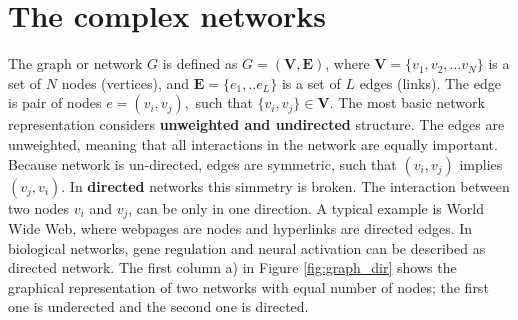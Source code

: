 







\section{The complex networks}

The graph or network $G$ is defined as $G=(\boldsymbol{V}, \boldsymbol{E})$, where $\boldsymbol{V} = \{ v_1, v_2, ... v_N\}$ is a set of $N$ nodes (vertices), and  $\boldsymbol{E} = \{e_1, .. e_L\}$ is a set of $L$ edges (links). The edge is pair of nodes $e = (v_i, v_j), $ such that $\{v_i,v_j\}\in \boldsymbol{V}$. The most basic network representation considers \textbf{unweighted and undirected} structure. The edges are unweighted, meaning that all interactions in the network are equally important.  Because network is un-directed, edges are symmetric, such that $(v_i, v_j)$ implies $(v_j, v_i)$. In \textbf{directed} networks this simmetry is broken. The interaction between two nodes $v_i$ and $v_j$, can be only in one direction. A typical example is World Wide Web, where webpages are nodes and hyperlinks are directed edges. In biological networks, gene regulation and neural activation can be described as directed network. The first column a) in Figure \ref{fig:graph_dir} shows the graphical representation of two networks with equal number of nodes; the first one is underected and the second one is directed. 

